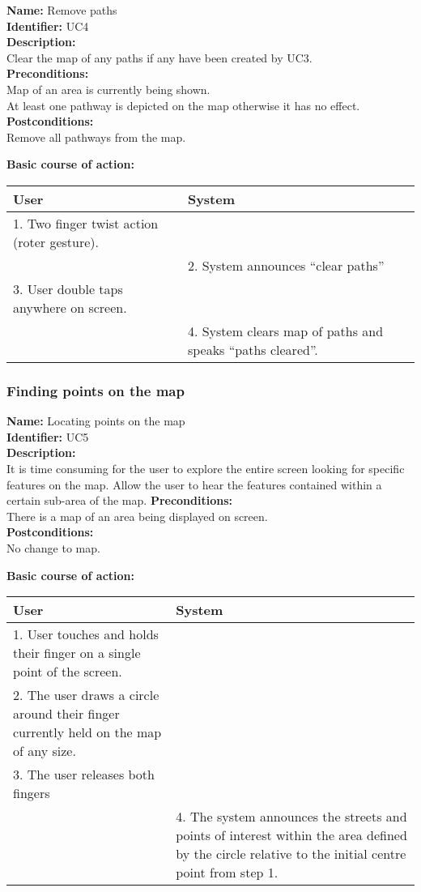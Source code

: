 \documentclass[11pt,twoside,a4paper]{article}
\begin{document}
\noindent
\textbf{Name:} Remove paths\\
\textbf{Identifier:} UC4\\
\textbf{Description:}\\
Clear the map of any paths if any have been created by UC3.\\
\textbf{Preconditions:}\\
Map of an area is currently being shown.\\
At least one pathway is depicted on the map otherwise it has no
effect.\\
\textbf{Postconditions:}\\
Remove all pathways from the map.

\noindent
\textbf{Basic course of action:}\\
\begin{tabularx}{\textwidth}{ |X|X| }
  \textbf{User} & \textbf{System}\\
  \hline
  1. Two finger twist action (roter gesture). & \\
  \hline
  & 2. System announces ``clear paths''\\
  \hline
  3. User double taps anywhere on screen. & \\
  \hline
  & 4. System clears map of paths and speaks ``paths cleared''.\\
  \hline
\end{tabularx}

\subsubsection{Finding points on the map}
\noindent
\textbf{Name:} Locating points on the map\\
\textbf{Identifier:} UC5\\
\textbf{Description:}\\
It is time consuming for the user to explore the entire screen looking
for specific features on the map. Allow the user to hear the features
contained within a certain sub-area of the map.
\textbf{Preconditions:}\\
There is a map of an area being displayed on screen.\\
\textbf{Postconditions:}\\
No change to map.

\noindent
\textbf{Basic course of action:}\\
\begin{tabularx}{\textwidth}{ |X|X| }
  \textbf{User} & \textbf{System}\\
  \hline
  1. User touches and holds their finger on a single point of the screen. & \\
  \hline
  2. The user draws a circle around their finger currently held on the
  map of any size. & \\
  \hline
  3. The user releases both fingers & \\
  \hline
  & 4. The system announces the streets and points of interest within
  the area defined by the circle relative to the initial centre point
  from step 1.\\
  \hline
  \hline
\end{tabularx}
\end{document}
